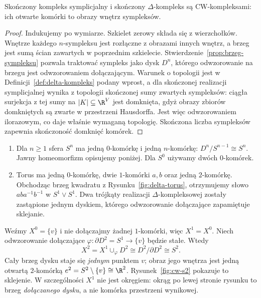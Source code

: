 \begin{stwierdzenie}
\label{prop:sympleksy-cw}
Skończony kompleks symplicjalny i
skończony $\Delta$-kompleks są
CW-kompleksami: ich otwarte komórki
to obrazy wnętrz sympleksów.
\end{stwierdzenie}
\begin{proof}
Indukujemy po wymiarze. Szkielet
zerowy składa się z wierzchołków.
Wnętrze każdego $n$-sympleksu
jest rozłączne z obrazami innych
wnętrz, a brzeg jest sumą ścian
zawartych w poprzednim szkielecie.
Stwierdzenie~\ref{prop:brzeg-sympleksu}
pozwala traktować sympleks
jako dysk $D^n$, którego
odwzorowanie na brzegu jest odwzorowaniem dołączającym.
Warunek o topologii jest w
Definicji~\ref{def:delta-kompleks}
podany wprost, a dla skończonej
realizacji symplicjalnej wynika
z topologii skończonej sumy zwartych sympleksów:
ciągła surjekcja z tej sumy na $|K|\subseteq\R^V$ jest domknięta,
gdyż obrazy zbiorów domkniętych są zwarte w przestrzeni Hausdorffa.
Jest więc odwzorowaniem ilorazowym, co daje właśnie wymaganą topologię.
Skończona liczba sympleksów
zapewnia skończoność domknięć komórek.
\end{proof}

\begin{przyklad}
\label{prz:cw-sfera-torus}
\begin{enumerate}[label=(\arabic*),leftmargin=*]
\item Dla $n\geq1$ sfera $S^n$
      ma jedną $0$-komórkę i jedną
      $n$-komórkę:
      $D^n/S^{n-1}\cong S^n$.
      Jawny homeomorfizm opisujemy
      poniżej.
      Dla $S^0$ używamy dwóch
      $0$-komórek.
\item Torus ma jedną $0$-komórkę,
      dwie $1$-komórki $a,b$ oraz
      jedną $2$-komórkę. Obchodząc
      brzeg kwadratu z
      Rysunku~\ref{fig:delta-torus},
      otrzymujemy słowo
      $aba^{-1}b^{-1}$ w
      $S^1\vee S^1$.
      Dwa trójkąty realizacji
      $\Delta$-kompleksowej zostały
      zastąpione jednym dyskiem,
      którego odwzorowanie dołączające
      zapamiętuje sklejanie.
\end{enumerate}
\end{przyklad}

\begin{przyklad}
\label{prz:cw-s2}
Weźmy $X^0=\{v\}$ i nie dołączajmy
żadnej $1$-komórki, więc $X^1=X^0$.
Niech odwzorowanie dołączające
$\varphi:\partial D^2=S^1\to\{v\}$
będzie stałe. Wtedy
\[
 X^2=X^1\cup_\varphi D^2
 \cong D^2/\partial D^2\cong S^2.
\]
Cały brzeg dysku staje się \emph{jednym}
punktem $v$; obraz jego wnętrza
jest jedną otwartą $2$-komórką
$e^2=S^2\setminus\{v\}\cong\R^2$.
Rysunek~\ref{fig:cw-s2} pokazuje to
sklejenie. W szczególności
$X^1$ nie jest okręgiem:
okrąg po lewej stronie rysunku
to brzeg \emph{dołączanego dysku},
a nie komórka przestrzeni wynikowej.
\end{przyklad}

